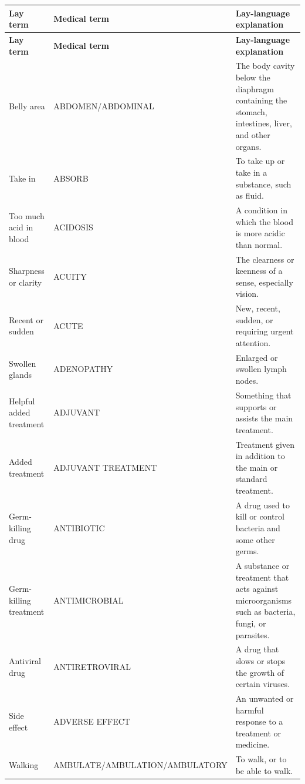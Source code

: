 \small
\setlength{\LTleft}{0pt}
\setlength{\LTright}{0pt}
\begin{longtable}{>{\raggedright\arraybackslash}p{} >{\raggedright\arraybackslash}p{} >{\raggedright\arraybackslash}p{}}
\toprule
\textbf{Lay term} & \textbf{Medical term} & \textbf{Lay-language explanation} \\
\midrule
\endfirsthead
\toprule
\textbf{Lay term} & \textbf{Medical term} & \textbf{Lay-language explanation} \\
\midrule
\endhead
\bottomrule
\endfoot

Belly area & ABDOMEN/ABDOMINAL & The body cavity below the diaphragm containing the stomach, intestines, liver, and other organs. \\
Take in & ABSORB & To take up or take in a substance, such as fluid. \\
Too much acid in blood & ACIDOSIS & A condition in which the blood is more acidic than normal. \\
Sharpness or clarity & ACUITY & The clearness or keenness of a sense, especially vision. \\
Recent or sudden & ACUTE & New, recent, sudden, or requiring urgent attention. \\
Swollen glands & ADENOPATHY & Enlarged or swollen lymph nodes. \\
Helpful added treatment & ADJUVANT & Something that supports or assists the main treatment. \\
Added treatment & ADJUVANT TREATMENT & Treatment given in addition to the main or standard treatment. \\
Germ-killing drug & ANTIBIOTIC & A drug used to kill or control bacteria and some other germs. \\
Germ-killing treatment & ANTIMICROBIAL & A substance or treatment that acts against microorganisms such as bacteria, fungi, or parasites. \\
Antiviral drug & ANTIRETROVIRAL & A drug that slows or stops the growth of certain viruses. \\
Side effect & ADVERSE EFFECT & An unwanted or harmful response to a treatment or medicine. \\
Walking & AMBULATE/\allowbreak AMBULATION/\allowbreak AMBULATORY & To walk, or to be able to walk. \\

\end{longtable}
